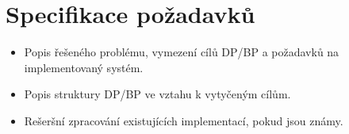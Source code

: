 \chapter{Specifikace požadavků}

\begin{itemize}
\item Popis řešeného problému, vymezení cílů DP/BP a požadavků na implementovaný systém.
\item Popis struktury DP/BP ve vztahu k vytyčeným cílům.
\item Rešeršní zpracování existujících implementací, pokud jsou známy.
\end{itemize}


%


%
%

%
